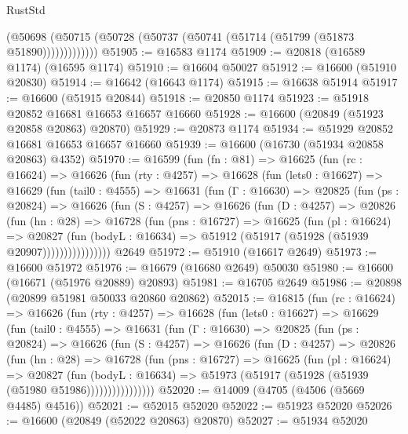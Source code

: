 \begin{lexlean}{RustStd}
\begin{coremodule}
{\begin{coremodule}
{{{{{{{{{{{{{{{{{{{{{{{{{{{{{{{{{{{{{{{{{{{{{{{{{{{{{{{              (@50698 (@50715 (@50728 (@50737 (@50741 (@51714 (@51799 (@51873 @51890)))))))))))))
@51905 := @16583 @1174
@51909 := @20818 (@16589 @1174) (@16595 @1174)
@51910 := @16604 @50027
@51912 := @16600 (@51910 @20830)
@51914 := @16642 (@16643 @1174)
@51915 := @16638 @51914
@51917 := @16600 (@51915 @20844)
@51918 := @20850 @1174
@51923 := @51918 @20852 @16681 @16653 @16657 @16660
@51928 := @16600 (@20849 (@51923 @20858 @20863) @20870)
@51929 := @20873 @1174
@51934 := @51929 @20852 @16681 @16653 @16657 @16660
@51939 := @16600 (@16730 (@51934 @20858 @20863) @4352)
@51970 := @16599
    (fun (fn : @81) =>
    @16625
      (fun (rc : @16624) =>
      @16626
        (fun (rty : @4257) =>
        @16628
          (fun (lets0 : @16627) =>
          @16629
            (fun (tail0 : @4555) =>
            @16631
              (fun (Γ : @16630) =>
              @20825
                (fun (ps : @20824) =>
                @16626
                  (fun (S : @4257) =>
                  @16626
                    (fun (D : @4257) =>
                    @20826
                      (fun (hn : @28) =>
                      @16728
                        (fun (pns : @16727) =>
                        @16625
                          (fun (pl : @16624) =>
                          @20827
                            (fun (bodyL : @16634) =>
                            @51912 (@51917 (@51928 (@51939 @20907))))))))))))))))
    @2649
@51972 := @51910 (@16617 @2649)
@51973 := @16600 @51972
@51976 := @16679 (@16680 @2649) @50030
@51980 := @16600 (@16671 (@51976 @20889) @20893)
@51981 := @16705 @2649
@51986 := @20898 (@20899 @51981 @50033 @20860 @20862)
@52015 := @16815
    (fun (rc : @16624) =>
    @16626
      (fun (rty : @4257) =>
      @16628
        (fun (lets0 : @16627) =>
        @16629
          (fun (tail0 : @4555) =>
          @16631
            (fun (Γ : @16630) =>
            @20825
              (fun (ps : @20824) =>
              @16626
                (fun (S : @4257) =>
                @16626
                  (fun (D : @4257) =>
                  @20826
                    (fun (hn : @28) =>
                    @16728
                      (fun (pns : @16727) =>
                      @16625
                        (fun (pl : @16624) =>
                        @20827
                          (fun (bodyL : @16634) =>
                          @51973 (@51917 (@51928 (@51939 (@51980 @51986))))))))))))))))
@52020 := @14009 (@4705 (@4506 (@5669 @4485) @4516))
@52021 := @52015 @52020
@52022 := @51923 @52020
@52026 := @16600 (@20849 (@52022 @20863) @20870)
@52027 := @51934 @52020
}}}}}}}}}}}}}}}}}}}}}}}}}}}}}}}}}}}}}}}}}}}}}}}}}}}}}}}
\end{coremodule}}
\end{coremodule}
\end{lexlean}
